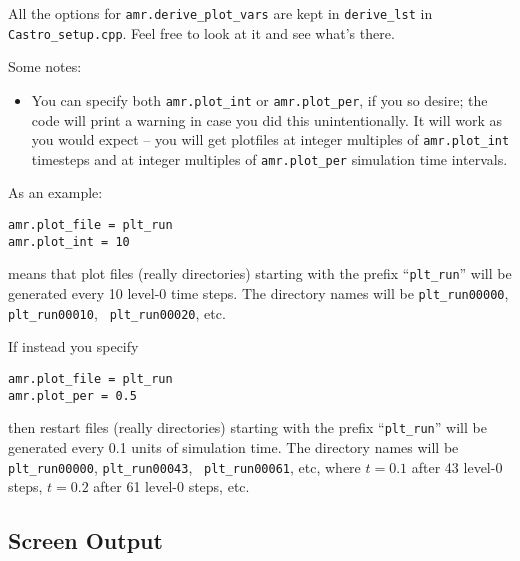All the options for {\tt amr.derive\_plot\_vars} are kept in
\texttt{derive\_lst} in {\tt Castro\_setup.cpp}.  Feel free to look at
it and see what's there.


Some notes:
\begin{itemize}

\item You can specify both {\tt amr.plot\_int} or {\tt amr.plot\_per},
  if you so desire; the code will print a warning in case you did this
  unintentionally. It will work as you would expect -- you will get plotfiles
  at integer multiples of {\tt amr.plot\_int} timesteps and at integer
  multiples of {\tt amr.plot\_per} simulation time intervals.

\end{itemize}


As an example:
\begin{lstlisting}
amr.plot_file = plt_run
amr.plot_int = 10
\end{lstlisting}
means that plot files (really directories) starting with the prefix
``{\tt plt\_run}'' will be generated every 10 level-0 time steps.  The
directory names will be {\tt plt\_run00000}, {\tt plt\_run00010}, {\tt
  plt\_run00020}, etc.


If instead you specify
\begin{lstlisting}
amr.plot_file = plt_run
amr.plot_per = 0.5
\end{lstlisting}
then restart files (really directories) starting with the prefix
``{\tt plt\_run}'' will be generated every 0.1 units of simulation time.  The
directory names will be {\tt plt\_run00000}, {\tt plt\_run00043}, {\tt
  plt\_run00061}, etc, where $t = 0.1$ after 43 level-0 steps, $t =
0.2$ after 61 level-0 steps, etc.



\subsection{Screen Output}


